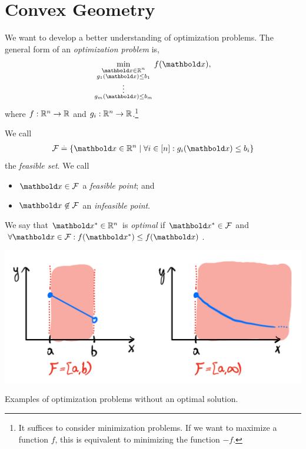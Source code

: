 
\chapter{Convex Geometry}

We want to develop a better understanding of optimization problems. The general form of an \emph{optimization problem} is, \begin{align}
    \min_{\substack{\vx \in \R^n \\ g_1(\vx) \leq b_1 \\ \vdots \\ g_m(\vx) \leq b_m}} f(\vx),
\end{align} where $f : \mathbb{R}^n \to \mathbb{R}$ and $g_i : \mathbb{R}^n \to \mathbb{R}$.\footnote{It suffices to consider minimization problems. If we want to maximize a function $f$, this is equivalent to minimizing the function $-f$.}

\begin{defn} We call \begin{align}
    \spa{F} \defeq \{\vx \in \R^n \mid \forall i \in [n]: g_i(\vx) \leq b_i\}
\end{align} the \emph{feasible set}. We call \begin{itemize}
    \item $\vx \in \spa{F}$ a \emph{feasible point}; and
    \item $\vx \not\in \spa{F}$ an \emph{infeasible point}.
\end{itemize}
\end{defn}
\begin{defn} We say that $\s{\vx} \in \R^n$ is \emph{optimal} if $\s{\vx} \in \spa{F}$ and $\forall \vx \in \spa{F}: f(\s{\vx}) \leq f(\vx)$.
\end{defn}
\begin{marginfigure}
\includegraphics[width=\textwidth]{notes/figures/no_opt.png}
\caption{Examples of optimization problems without an optimal solution.}
\end{marginfigure}

